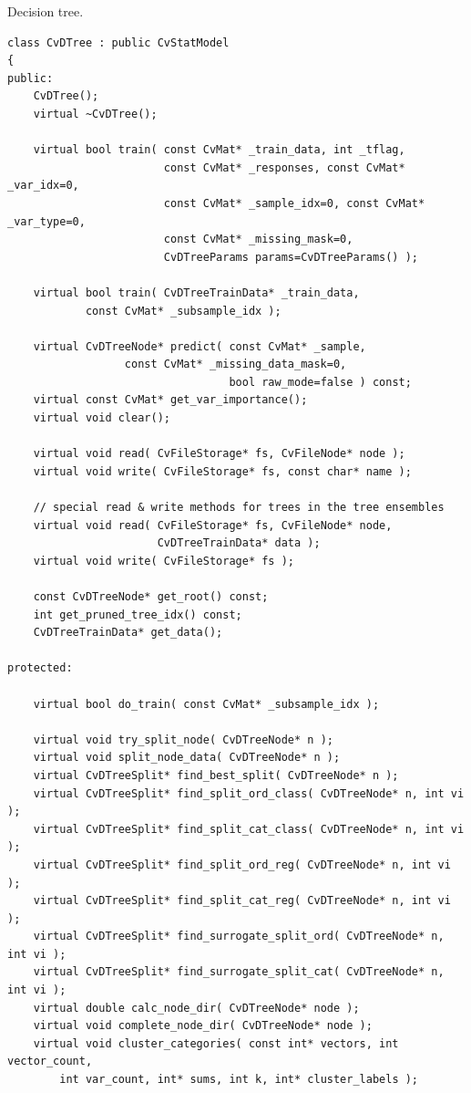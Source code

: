 Decision tree.

\begin{lstlisting}
class CvDTree : public CvStatModel
{
public:
    CvDTree();
    virtual ~CvDTree();

    virtual bool train( const CvMat* _train_data, int _tflag,
                        const CvMat* _responses, const CvMat* _var_idx=0,
                        const CvMat* _sample_idx=0, const CvMat* _var_type=0,
                        const CvMat* _missing_mask=0,
                        CvDTreeParams params=CvDTreeParams() );

    virtual bool train( CvDTreeTrainData* _train_data, 
			const CvMat* _subsample_idx );

    virtual CvDTreeNode* predict( const CvMat* _sample, 
				  const CvMat* _missing_data_mask=0,
                                  bool raw_mode=false ) const;
    virtual const CvMat* get_var_importance();
    virtual void clear();

    virtual void read( CvFileStorage* fs, CvFileNode* node );
    virtual void write( CvFileStorage* fs, const char* name );

    // special read & write methods for trees in the tree ensembles
    virtual void read( CvFileStorage* fs, CvFileNode* node,
                       CvDTreeTrainData* data );
    virtual void write( CvFileStorage* fs );

    const CvDTreeNode* get_root() const;
    int get_pruned_tree_idx() const;
    CvDTreeTrainData* get_data();

protected:

    virtual bool do_train( const CvMat* _subsample_idx );

    virtual void try_split_node( CvDTreeNode* n );
    virtual void split_node_data( CvDTreeNode* n );
    virtual CvDTreeSplit* find_best_split( CvDTreeNode* n );
    virtual CvDTreeSplit* find_split_ord_class( CvDTreeNode* n, int vi );
    virtual CvDTreeSplit* find_split_cat_class( CvDTreeNode* n, int vi );
    virtual CvDTreeSplit* find_split_ord_reg( CvDTreeNode* n, int vi );
    virtual CvDTreeSplit* find_split_cat_reg( CvDTreeNode* n, int vi );
    virtual CvDTreeSplit* find_surrogate_split_ord( CvDTreeNode* n, int vi );
    virtual CvDTreeSplit* find_surrogate_split_cat( CvDTreeNode* n, int vi );
    virtual double calc_node_dir( CvDTreeNode* node );
    virtual void complete_node_dir( CvDTreeNode* node );
    virtual void cluster_categories( const int* vectors, int vector_count,
        int var_count, int* sums, int k, int* cluster_labels );


\end{lstlisting}
